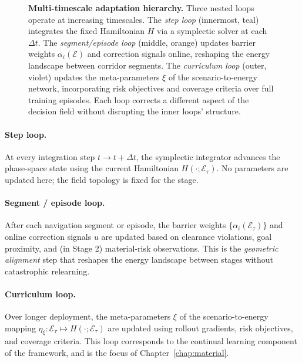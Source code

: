 \begin{figure}[htbp]
\caption{%
  \textbf{Multi-timescale adaptation hierarchy.}
  Three nested loops operate at increasing timescales.
  The \emph{step loop} (innermost, teal) integrates the fixed Hamiltonian
  $H$ via a symplectic solver at each $\Delta t$.
  The \emph{segment/episode loop} (middle, orange) updates barrier weights
  $\alpha_i(\mathcal{E})$ and correction signals online, reshaping the
  energy landscape between corridor segments.
  The \emph{curriculum loop} (outer, violet) updates the meta-parameters
  $\xi$ of the scenario-to-energy network, incorporating risk objectives
  and coverage criteria over full training episodes.
  Each loop corrects a different aspect of the decision field
  without disrupting the inner loops' structure.
}
\label{fig:prelim:timescales}
\end{figure}

\paragraph{Step loop.}
At every integration step $t \to t + \Delta t$, the symplectic integrator
advances the phase-space state using the current Hamiltonian $H(\cdot;\mathcal{E}_\tau)$.
No parameters are updated here; the field topology is fixed for the stage.

\paragraph{Segment / episode loop.}
After each navigation segment or episode, the barrier weights
$\{\alpha_i(\mathcal{E}_\tau)\}$ and online correction signals $u$ are updated
based on clearance violations, goal proximity, and (in Stage 2) material-risk
observations.
This is the \emph{geometric alignment} step that reshapes the energy landscape
between stages without catastrophic relearning.

\paragraph{Curriculum loop.}
Over longer deployment, the meta-parameters $\xi$ of the
scenario-to-energy mapping $\eta_\xi : \mathcal{E}_\tau \mapsto H(\cdot;\mathcal{E}_\tau)$
are updated using rollout gradients, risk objectives, and coverage criteria.
This loop corresponds to the continual learning component of the framework,
and is the focus of Chapter~\ref{chap:material}.

